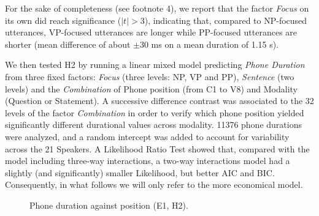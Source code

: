 For the sake of completeness (see footnote 4), we report that the factor \textit{Focus} on its own did reach significance ($|t|>3$), indicating that, compared to NP-focused utterances, VP-focused utterances are longer while PP-focused utterances are shorter (mean difference of about $\pm$30 ms on a mean duration of 1.15 s).

We then tested H2 by running a linear mixed model predicting \textit{Phone Duration} from three fixed factors: \textit{Focus} (three levels: NP, VP and PP), \textit{Sentence} (two levels) and the \textit{Combination} of Phone position (from C1 to V8) and Modality (Question or Statement).  A successive difference contrast was associated to the 32 levels of the factor \textit{Combination} in order to verify which phone position yielded significantly different durational values across modality. 11376 phone durations were analyzed, and a random intercept was added to account for variability across the 21 Speakers. A Likelihood Ratio Test showed that, compared with the model including three-way interactions, a two-way interactions model had a slightly (and significantly) smaller Likelihood, but better AIC and BIC. Consequently, in what follows we will only refer to the more economical model. 

\begin{figure}
\centering
{}
\caption{Phone duration against position (E1, H2).}
\label{fig402}\end{figure}

